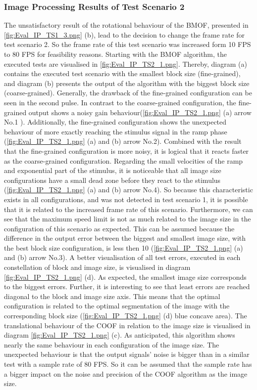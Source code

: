 \subsubsection{Image Processing Results of Test Scenario 2}
The unsatisfactory result of the rotational behaviour of the \gls{BMOF}, presented in \ref{fig:Eval_IP_TS1_3.png} (b), lead to the decision to change the frame rate for test scenario 2. So the frame rate of this test scenario was increased form 10 \gls{FPS} to 80 \gls{FPS} for feasibility reasons. 
Starting with the \gls{BMOF} algorithm, the executed tests are visualised in \ref{fig:Eval_IP_TS2_1.png}. Thereby, diagram (a) contains the 
executed test scenario with the smallest block size (fine-grained), and diagram (b) presents the output of the algorithm with the biggest block size (coarse-grained). Generally, the drawback of the fine-grained configuration can be seen in the second pulse. In contrast to the coarse-grained configuration, the fine-grained output shows a noisy gain behaviour(\ref{fig:Eval_IP_TS2_1.png} (a) arrow No.1 ). Additionally, the fine-grained configuration shows the unexpected behaviour of more exactly reaching the stimulus signal in the ramp phase (\ref{fig:Eval_IP_TS2_1.png} (a) and (b) arrow No.2). Combined with the result that the fine-grained configuration is more noisy, it is logical that it reacts faster as the coarse-grained configuration. Regarding the small velocities of the ramp and exponential part of the stimulus, it is noticeable that all image size configurations have a small dead zone before they react to the stimulus (\ref{fig:Eval_IP_TS2_1.png} (a) and (b) arrow No.4). So because this characteristic exists in all configurations, and was not detected in test scenario 1, it is possible that it is related to the increased frame rate of this scenario.  
Furthermore, we can see that the maximum speed limit is not as much related to the image size in the configuration of this scenario as expected. This can be assumed because the difference in the output error between the biggest and smallest image size, with the best block size configuration, is less then 10\text{\%} (\ref{fig:Eval_IP_TS2_1.png} (a) and (b) arrow No.3).
A better visualisation of all test errors, executed in each constellation of block and image size, is visualised in diagram 
\ref{fig:Eval_IP_TS2_1.png} (d). As expected, the smallest image size corresponds to the biggest errors. Further, it is interesting to see that least errors are reached diagonal to the block and image size axis. This means that the optimal configuration is related to the optimal segmentation of the image with the corresponding block size (\ref{fig:Eval_IP_TS2_1.png} (d) blue concave area). 
The translational behaviour of the \gls{COOF} in relation to the image size is visualised in diagram \ref{fig:Eval_IP_TS2_1.png} (c). 
As anticipated, this algorithm shows nearly the same behaviour in each configuration of the image size. The unexpected behaviour is that the output signals' noise is bigger than in a similar test with a sample rate of 80 \gls{FPS}. So it can be assumed that the sample rate has a bigger impact on the noise and precision of the \gls{COOF} algorithm as the image size. 

